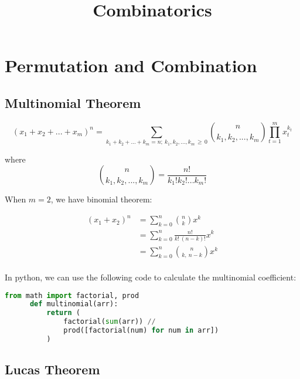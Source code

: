 \documentclass{article}
\title{Combinatorics}
\author{}
\date{}
\begin{document}
\maketitle

\section{Permutation and Combination}
  \subsection{Multinomial Theorem}
    \begin{equation*}
      (x_1 + x_2 + ... + x_m)^n = 
      \sum_{k_1 + k_2 + ... + k_m = n; \: k_1, k_2, ..., k_m \,\geq\, 0}
      \binom{n}{k_1, k_2, ..., k_m} \prod_{t = 1}^{m} x_t^{k_t}
    \end{equation*}

    where
    \begin{equation*}
      \binom{n}{k_1, k_2, ..., k_m} = \frac{n!}{k_1! k_2! ... k_m!}
    \end{equation*}

    \bigskip
    
    When $m = 2$, we have binomial theorem:
    
    \begin{align*}
      (x_1 + x_2)^n & = \sum_{k = 0}^{n} \binom{n}{k} x^k \\
                    & = \sum_{k = 0}^{n} \frac{n!}{k! \: (n-k)!} x^k \\
                    & = \sum_{k = 0}^{n} \binom{n}{k, \: n-k} x^k \\
    \end{align*}

    \bigskip

    In python, we can use the following code to calculate the multinomial coefficient:
    \begin{lstlisting}[language=Python, basicstyle=\small]
      from math import factorial, prod
      def multinomial(arr):
          return (
              factorial(sum(arr)) // 
              prod([factorial(num) for num in arr])
          )
    \end{lstlisting}
  \subsection{Lucas Theorem}
\end{document}
